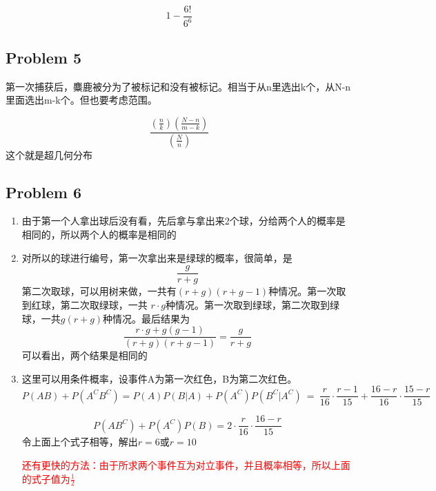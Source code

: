\documentclass{article}
\begin{document}
$$
1-\frac{6!}{6^{6}} 
$$

\clearpage

\subsection*{Problem 5}
第一次捕获后，麋鹿被分为了被标记和没有被标记。相当于从n里选出k个，从N-n里面选出m-k个。但也要考虑范围。

$$
\frac{\left( \frac{n}{k} \right)  \left( \frac{N-n}{m-k} \right) } {\left( \frac{N}{n} \right)  } 
$$
这个就是超几何分布
\clearpage

\subsection*{Problem 6}
\begin{enumerate}[label=(\alph*)]
\item 由于第一个人拿出球后没有看，先后拿与拿出来2个球，分给两个人的概率是相同的，所以两个人的概率是相同的

\item 对所以的球进行编号，第一次拿出来是绿球的概率，很简单，是
$$
\frac{g}{r+g} 
$$
第二次取球，可以用树来做，一共有$\left( r+g\right)  \left( r+g-1\right)  $种情况。第一次取到红球，第二次取绿球，一共 $r\cdot g$种情况。第一次取到绿球，第二次取到绿球，一共$g\left( r+g\right)$种情况。最后结果为
$$
\frac{r\cdot g+g\left( g-1\right)  }{\left( r+g\right)  \left( r+g-1\right)  } =\frac{g}{r+g} 
$$
可以看出，两个结果是相同的

\item 这里可以用条件概率，设事件A为第一次红色，B为第二次红色。
$$
P\left( AB\right)  +P(A^{C}B^{C})=P\left( A\right)  P\left( B|A\right)  +P\left( A^{C}\right)  P(B^{C}|A^{C})\  =\  \frac{r}{16} \cdot \frac{r-1}{15} +\frac{16-r}{16} \cdot \frac{15-r}{15} 
$$

$$
P(AB^{C})+P(A^{C})P(B)=2\cdot \frac{r}{16} \cdot \frac{16-r}{15} 
$$
令上面上个式子相等，解出$r=6$或$r=10$

\textcolor{red}{还有更快的方法：由于所求两个事件互为对立事件，并且概率相等，所以上面的式子值为$\frac{1}{2}$}
\end{enumerate}

\clearpage
\end{document}
